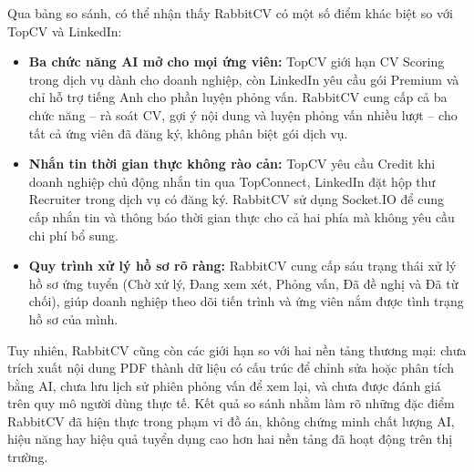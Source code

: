 Qua bảng so sánh, có thể nhận thấy RabbitCV có một số điểm khác biệt so với TopCV và LinkedIn:

\begin{itemize}
    \item \textbf{Ba chức năng AI mở cho mọi ứng viên:} TopCV giới hạn CV Scoring trong dịch vụ dành cho doanh nghiệp, còn LinkedIn yêu cầu gói Premium và chỉ hỗ trợ tiếng Anh cho phần luyện phỏng vấn. RabbitCV cung cấp cả ba chức năng -- rà soát CV, gợi ý nội dung và luyện phỏng vấn nhiều lượt -- cho tất cả ứng viên đã đăng ký, không phân biệt gói dịch vụ.
    \item \textbf{Nhắn tin thời gian thực không rào cản:} TopCV yêu cầu Credit khi doanh nghiệp chủ động nhắn tin qua TopConnect, LinkedIn đặt hộp thư Recruiter trong dịch vụ có đăng ký. RabbitCV sử dụng Socket.IO để cung cấp nhắn tin và thông báo thời gian thực cho cả hai phía mà không yêu cầu chi phí bổ sung.
    \item \textbf{Quy trình xử lý hồ sơ rõ ràng:} RabbitCV cung cấp sáu trạng thái xử lý hồ sơ ứng tuyển (Chờ xử lý, Đang xem xét, Phỏng vấn, Đã đề nghị và Đã từ chối), giúp doanh nghiệp theo dõi tiến trình và ứng viên nắm được tình trạng hồ sơ của mình.
\end{itemize}

Tuy nhiên, RabbitCV cũng còn các giới hạn so với hai nền tảng thương mại: chưa trích xuất nội dung PDF thành dữ liệu có cấu trúc để chỉnh sửa hoặc phân tích bằng AI, chưa lưu lịch sử phiên phỏng vấn để xem lại, và chưa được đánh giá trên quy mô người dùng thực tế. Kết quả so sánh nhằm làm rõ những đặc điểm RabbitCV đã hiện thực trong phạm vi đồ án, không chứng minh chất lượng AI, hiệu năng hay hiệu quả tuyển dụng cao hơn hai nền tảng đã hoạt động trên thị trường.


